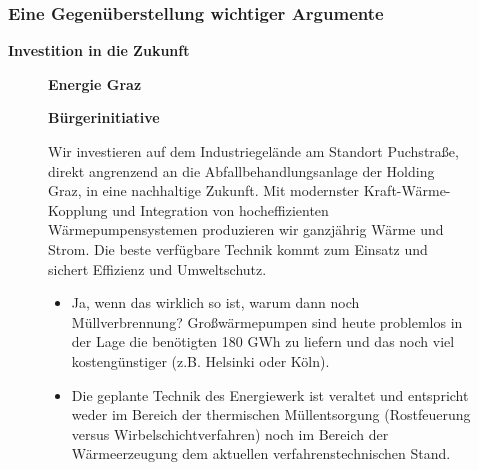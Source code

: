 \documentclass[8pt]{beamer}
\begin{document}
 \begin{frame}[t]
		\frametitle{Eine Gegenüberstellung wichtiger Argumente}
		\textbf{Investition in die Zukunft} 
		\begin{figure}[htbp]
			\begin{minipage}[t]{0.38\textwidth}
				\textbf{Energie Graz}
			\end{minipage}
			\hfill
			\begin{minipage}[t]{0.58\textwidth}
				\textbf{Bürgerinitiative}
			\end{minipage}
		\end{figure}
		\begin{figure}[htbp]
			\begin{minipage}[t]{0.38\textwidth}
				\begin{framed}				
				Wir investieren auf dem Industriegelände am Standort Puchstraße, direkt angrenzend an die Abfallbehandlungsanlage der Holding Graz, in eine nachhaltige Zukunft. Mit modernster Kraft-Wärme-Kopplung und Integration von hocheffizienten Wärmepumpensystemen produzieren wir ganzjährig Wärme und Strom. Die beste verfügbare Technik kommt zum Einsatz und sichert Effizienz und Umweltschutz.
				\end{framed}
			\end{minipage}
			\hfill
			\begin{minipage}[t]{0.58\textwidth}
				\begin{framed}
                \begin{itemize}
                  \item Ja, wenn das wirklich so ist, warum dann noch Müllverbrennung? Großwärmepumpen sind heute problemlos in der Lage die benötigten 180 GWh zu liefern und das noch viel kostengünstiger (z.B. Helsinki oder Köln).
                  \item Die geplante Technik des Energiewerk ist veraltet und entspricht weder im Bereich der thermischen Müllentsorgung (Rostfeuerung versus Wirbelschichtverfahren) noch im Bereich der Wärmeerzeugung dem aktuellen verfahrenstechnischen Stand.
                 \end{itemize}
				\end{framed}
			\end{minipage}	
			\end{figure}
\end{frame}			
			
\end{document}
